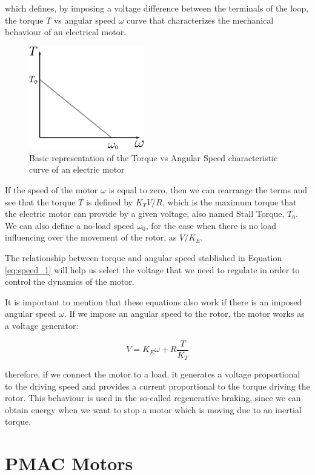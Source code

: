 which defines, by imposing a voltage difference between the terminals of the loop, the torque $T$ vs angular speed $\omega$ curve that characterizes the mechanical behaviour of an electrical motor.

\begin{figure}[htbp]
\centering
\includegraphics[width=5cm]{Images/torque_speed.png} 
\caption[Torque-Speed Curve]{Basic representation of the Torque vs Angular Speed characteristic curve of an electric motor}
\label{fig:torque_speed}
\end{figure}

If the speed of the motor $\omega$ is equal to zero, then we can rearrange the terms and see that the torque $T$ is defined by $K_{T}V/R$, which is the maximum torque that the electric motor can provide by a given voltage, also named Stall Torque, $T_{0}$. We can also define a no-load speed $\omega_{0}$, for the case when there is no load influencing over the movement of the rotor, as $V/K_{E}$.

The relationship between torque and angular speed stablished in Equation \ref{eq:speed_1} will help us select the voltage that we need to regulate in order to control the dynamics of the motor.

It is important to mention that these equations also work if there is an imposed angular speed $\omega$. If we impose an angular speed to the rotor, the motor works as a voltage generator:

\begin{equation} \label{eq:generator_1}
	V = K_{E} \omega + R\frac{T}{K_{T}}
\end{equation}

therefore, if we connect the motor to a load, it generates a voltage proportional to the driving speed and provides a current proportional to the torque driving the rotor. This behaviour is used in the so-called regenerative braking, since we can obtain energy when we want to stop a motor which is moving due to an inertial torque.

\section{PMAC Motors}

